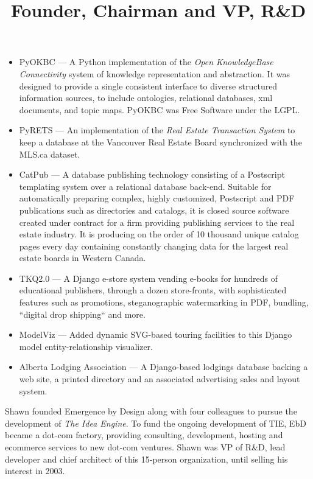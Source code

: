 \begin{resume}
\begin{position}
\begin{itemize}
  \item PyOKBC --- A Python implementation of the 
     \emph{Open KnowledgeBase Connectivity}
  system of knowledge representation and abstraction.
  It was designed to provide a single consistent interface to diverse structured
  information sources, to include ontologies, relational databases,
  xml documents, and topic maps.  PyOKBC was Free Software under the LGPL.

  \item PyRETS --- An implementation of the \emph{Real Estate Transaction System}
  to keep a database at the Vancouver Real Estate Board synchronized with 
  the MLS.ca dataset.

  \item CatPub --- A database publishing technology consisting of a
  Postscript templating system over a relational database back-end.
  Suitable for automatically preparing complex, highly customized,
  Postscript and PDF publications such as directories and catalogs,
  it is closed source software created under contract for a firm
  providing publishing services to the real estate industry.  
  It is producing on the order of 10 thousand unique catalog pages 
  every day containing constantly changing data for the largest 
  real estate boards in Western Canada.

  \item TKQ2.0 --- A Django e-store system vending e-books for hundreds
  of educational publishers, through a dozen store-fronts, with sophisticated 
  features such as promotions, steganographic watermarking in PDF, bundling,
  ``digital drop shipping`` and more.

  \item ModelViz --- Added dynamic SVG-based touring facilities to this Django
  model entity-relationship visualizer.

  \item Alberta Lodging Association --- A Django-based lodgings database 
  backing a web site, a printed directory and an associated advertising 
  sales and layout system.

\end{itemize}

\end{position}




\title{ Founder, Chairman and VP, R\&D }

\begin{position}
  Shawn founded Emergence by Design along with four colleagues to pursue
  the development of \emph{The Idea Engine}.  To fund the ongoing development of
  TIE, EbD became a dot-com factory, providing consulting,
  development, hosting and ecommerce services to new dot-com ventures.
  Shawn was VP of R\&D, lead developer and chief architect of this 15-person
  organization, until selling his interest in 2003.


\end{position}
\end{resume}
